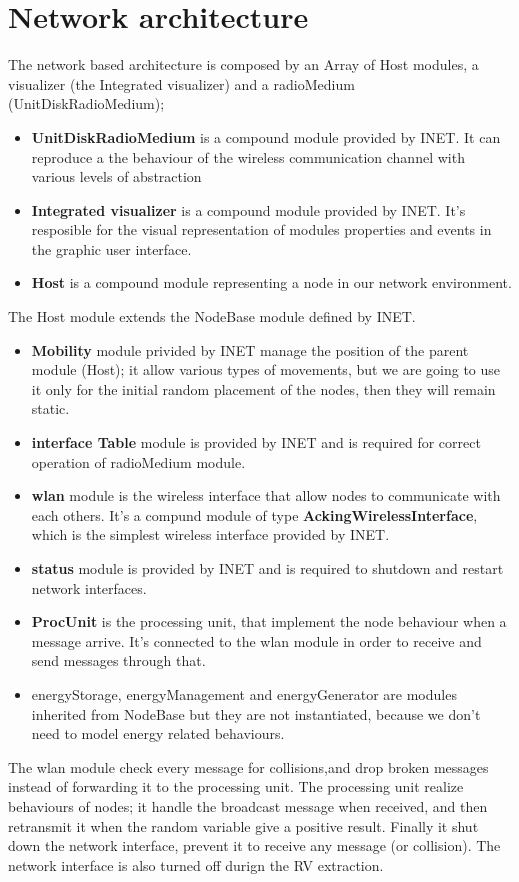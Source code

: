 \section{Network architecture}
The network based architecture is composed by an Array of Host modules, a
visualizer (the Integrated visualizer) and a radioMedium (UnitDiskRadioMedium);
\begin{itemize}
    \item \textbf{UnitDiskRadioMedium} is a compound module provided by INET. It can reproduce a the behaviour of the wireless communication 
    channel with various levels of abstraction
    \item \textbf{Integrated visualizer} is a compound module provided by INET. It's resposible for the visual representation of modules properties 
    and events in the graphic user interface.
    \item \textbf{Host} is a compound module representing a node in our network environment. 
\end{itemize}
The Host module extends the NodeBase module defined by INET.
\begin{itemize}
    \item \textbf{Mobility} module privided by INET manage the position of the parent module (Host); it allow various types of movements,
        but we are going to use it only for the initial random placement of the nodes, then they will remain static.
    \item \textbf{interface Table} module is provided by INET and is required for correct operation of radioMedium module.
    \item \textbf{wlan} module is the wireless interface that allow nodes to communicate with each others. It's a compund module of type 
        \textbf{AckingWirelessInterface}, which is the simplest wireless interface provided by INET.
    \item \textbf{status} module is provided by INET and is required to shutdown and restart network interfaces.
    \item \textbf{ProcUnit} is the processing unit, that implement the node behaviour when a message arrive. It's connected to
    the wlan module in order to receive and send messages through that.
    \item energyStorage, energyManagement and energyGenerator are modules inherited from NodeBase but they are not instantiated,
        because we don't need to model energy related behaviours.
\end{itemize}
The wlan module check every message for collisions,and drop broken messages instead of forwarding it to the processing unit. 
The processing unit realize behaviours of nodes; it handle the broadcast message when received, and then retransmit it when 
the random variable give a positive result. Finally it shut down the network interface, prevent it to receive any message (or collision).
The network interface is also turned off durign the RV extraction. \\
